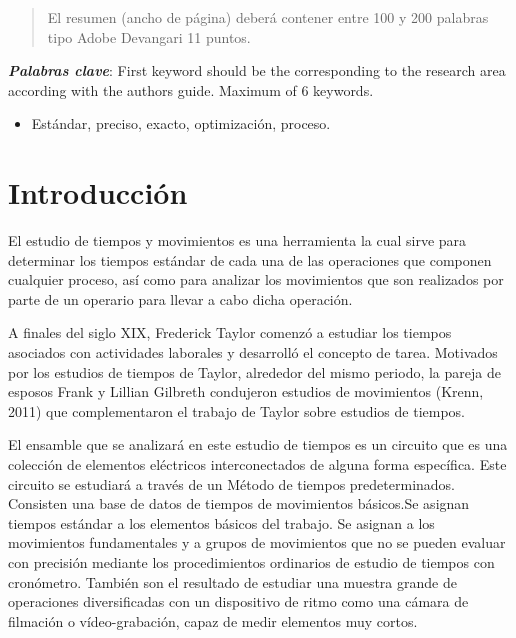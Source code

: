             \begin{abstract}
            \noindent 
            El resumen (ancho de página) deberá contener entre 100 y 200 palabras tipo Adobe Devangari 11 puntos.
            
            \end{abstract}
            \textbf{\textit{Palabras clave}}: {First keyword should be the corresponding to the research area according with the authors guide. Maximum of 6 keywords.}
            \begin{itemize}
                \item Estándar, preciso, exacto, optimización, proceso.
            \end{itemize}
            
            \section{Introducción}
            
            
            El estudio de tiempos y movimientos es una herramienta la cual sirve para determinar los tiempos estándar de cada una de las operaciones que componen cualquier proceso, así como para analizar los movimientos que son realizados por parte de un operario para llevar a cabo dicha operación.
            
            A finales del siglo XIX, Frederick Taylor comenzó a estudiar los tiempos asociados con actividades laborales y desarrolló el concepto de tarea. Motivados por los estudios de tiempos de Taylor, alrededor del mismo periodo, la pareja de esposos Frank y Lillian Gilbreth condujeron estudios de movimientos (Krenn, 2011) que complementaron el trabajo de Taylor sobre estudios de tiempos. 
            \cite{andrade2019estudio}
            
            El ensamble que se analizará en este estudio de tiempos es un circuito  que es una colección de elementos eléctricos interconectados de alguna forma específica. Este circuito se estudiará a través de un Método de tiempos predeterminados. Consisten una base de datos de tiempos de movimientos básicos.Se asignan tiempos estándar a los elementos básicos del trabajo. Se asignan a los movimientos fundamentales y a grupos de movimientos que no se pueden evaluar con precisión mediante los procedimientos ordinarios de estudio de tiempos con cronómetro. También son el resultado de estudiar una muestra grande de operaciones diversificadas con un dispositivo de ritmo como una cámara de filmación o vídeo-grabación, capaz de medir elementos muy cortos.
            
